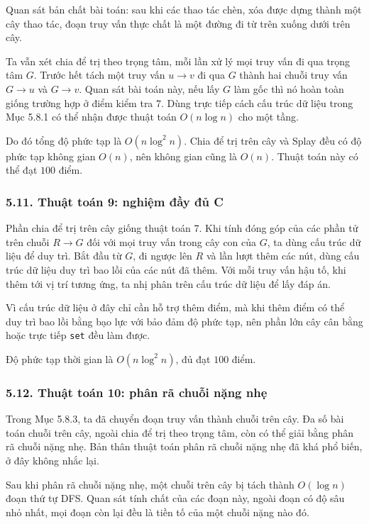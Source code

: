 \documentclass[11pt]{article}
\begin{document}
Quan sát bản chất bài toán: sau khi các thao tác chèn, xóa được dựng thành
một cây thao tác, đoạn truy vấn thực chất là một đường đi từ trên xuống dưới
trên cây.

Ta vẫn xét chia để trị theo trọng tâm, mỗi lần xử lý mọi truy vấn đi qua trọng
tâm \(G\). Trước hết tách một truy vấn \(u\to v\) đi qua \(G\) thành hai chuỗi
truy vấn \(G\to u\) và \(G\to v\). Quan sát bài toán này, nếu lấy \(G\) làm
gốc thì nó hoàn toàn giống trường hợp ở điểm kiểm tra 7. Dùng trực tiếp cách
cấu trúc dữ liệu trong Mục 5.8.1 có thể nhận được thuật toán
\(O(n\log n)\) cho một tầng.

Do đó tổng độ phức tạp là \(O(n\log^2 n)\). Chia để trị trên cây và Splay đều
có độ phức tạp không gian \(O(n)\), nên không gian cũng là \(O(n)\). Thuật
toán này có thể đạt \(100\) điểm.

\subsubsection*{5.11. Thuật toán 9: nghiệm đầy đủ C}

Phần chia để trị trên cây giống thuật toán 7. Khi tính đóng góp của các phần
tử trên chuỗi \(R\to G\) đối với mọi truy vấn trong cây con của \(G\), ta dùng
cấu trúc dữ liệu để duy trì. Bắt đầu từ \(G\), đi ngược lên \(R\) và lần lượt
thêm các nút, dùng cấu trúc dữ liệu duy trì bao lồi của các nút đã thêm. Với
mỗi truy vấn hậu tố, khi thêm tới vị trí tương ứng, ta nhị phân trên cấu trúc
dữ liệu để lấy đáp án.

Vì cấu trúc dữ liệu ở đây chỉ cần hỗ trợ thêm điểm, mà khi thêm điểm có thể
duy trì bao lồi bằng bạo lực với bảo đảm độ phức tạp, nên phần lớn cây cân
bằng hoặc trực tiếp \texttt{set} đều làm được.

Độ phức tạp thời gian là \(O(n\log^2 n)\), đủ đạt \(100\) điểm.

\subsubsection*{5.12. Thuật toán 10: phân rã chuỗi nặng nhẹ}

Trong Mục 5.8.3, ta đã chuyển đoạn truy vấn thành chuỗi trên cây. Đa số bài
toán chuỗi trên cây, ngoài chia để trị theo trọng tâm, còn có thể giải bằng
phân rã chuỗi nặng nhẹ. Bản thân thuật toán phân rã chuỗi nặng nhẹ đã khá phổ
biến, ở đây không nhắc lại.

Sau khi phân rã chuỗi nặng nhẹ, một chuỗi trên cây bị tách thành
\(O(\log n)\) đoạn thứ tự DFS. Quan sát tính chất của các đoạn này, ngoài đoạn
có độ sâu nhỏ nhất, mọi đoạn còn lại đều là tiền tố của một chuỗi nặng nào đó.
\end{document}
